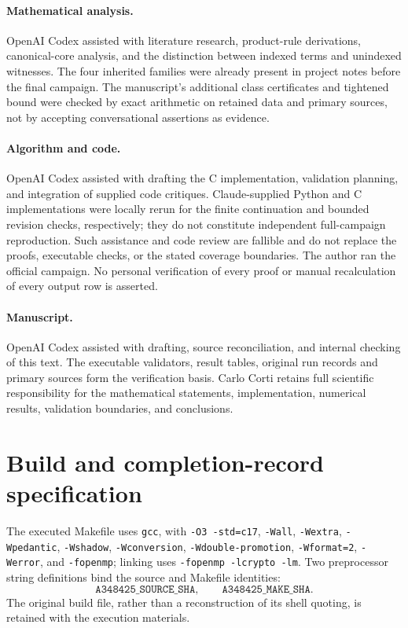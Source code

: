 \documentclass[11pt]{article}
\theoremstyle{definition}
\theoremstyle{remark}
\begin{document}
\paragraph{Mathematical analysis.}
OpenAI Codex assisted with literature research, product-rule derivations,
canonical-core analysis, and the distinction between indexed terms and
unindexed witnesses. The four inherited families were already present
in project notes before the final campaign. The manuscript's additional
class certificates and tightened bound were checked by exact arithmetic
on retained data and primary sources, not by accepting conversational
assertions as evidence.
\paragraph{Algorithm and code.}
OpenAI Codex assisted with drafting the C implementation, validation
planning, and integration of supplied code critiques. Claude-supplied
Python and C implementations were locally rerun for the finite
continuation and bounded revision checks, respectively; they do not
constitute independent full-campaign reproduction. Such assistance and code review are fallible and do not
replace the proofs, executable checks, or the stated coverage boundaries.
The author ran the official campaign. No personal verification of
every proof or manual recalculation of every output row is asserted.
\paragraph{Manuscript.}
OpenAI Codex assisted with drafting, source reconciliation, and internal
checking of this text. The executable validators, result tables,
original run records and primary sources form the verification basis.
Carlo Corti retains full scientific responsibility for the mathematical
statements, implementation, numerical results, validation boundaries,
and conclusions.

\appendix
\section{Build and completion-record specification}\label{app:records}
The executed Makefile uses \texttt{gcc}, with \texttt{-O3 -std=c17},
\texttt{-Wall}, \texttt{-Wextra}, \texttt{-Wpedantic},
\texttt{-Wshadow}, \texttt{-Wconversion},
\texttt{-Wdouble-promotion}, \texttt{-Wformat=2}, \texttt{-Werror},
and \texttt{-fopenmp}; linking uses
\texttt{-fopenmp -lcrypto -lm}. Two preprocessor string definitions bind the source and Makefile identities:
\[\texttt{A348425\_SOURCE\_SHA},\qquad \texttt{A348425\_MAKE\_SHA}.\] The original build file, rather than a
reconstruction of its shell quoting, is retained with the execution materials.
\end{document}
